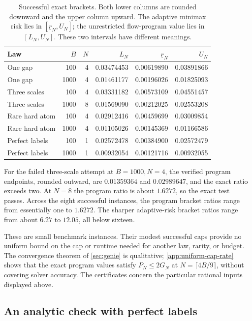 \begin{table}[htbp]
\centering
\small
\setlength{\tabcolsep}{4pt}
\begin{tabular}{lrr rrr}
\toprule
Law & $B$ & $N$ & $L_N$ & $\underline r_N$ & $U_N$\\
\midrule
One gap & 100 & 4 & 0.03474453 & 0.00619890 & 0.03891866\\
One gap & 1000 & 4 & 0.01461177 & 0.00196026 & 0.01825093\\
Three scales & 100 & 4 & 0.03331182 & 0.00573109 & 0.04551457\\
Three scales & 1000 & 8 & 0.01569090 & 0.00212025 & 0.02553208\\
Rare hard atom & 100 & 4 & 0.02912416 & 0.00459699 & 0.03009854\\
Rare hard atom & 1000 & 4 & 0.01105026 & 0.00145369 & 0.01166586\\
Perfect labels & 100 & 1 & 0.02572478 & 0.00384900 & 0.02572479\\
Perfect labels & 1000 & 1 & 0.00932054 & 0.00121716 & 0.00932055\\
\bottomrule
\end{tabular}
\caption{Successful exact brackets. Both lower columns are rounded
downward and the upper column upward. The adaptive minimax risk lies
in $[\underline r_N,U_N]$; the unrestricted flow-program value lies
in $[L_N,U_N]$. These two intervals have different meanings.}
\label{tab:exact-brackets}
\end{table}

For the failed three-scale attempt at $B=1000,N=4$, the verified
program endpoints, rounded outward, are $0.01359364$ and $0.02989647$,
and the exact ratio exceeds two. At $N=8$ the program ratio is about
$1.6272$, so the exact test passes. Across the eight successful
instances, the program bracket ratios range from essentially one to
$1.6272$. The sharper adaptive-risk bracket ratios range from about
$6.27$ to $12.05$, all below sixteen.

These are small benchmark instances. Their modest successful caps
provide no uniform bound on the cap or runtime needed for another law,
rarity, or budget. The convergence theorem of \cref{sec:genie} is qualitative;
\cref{app:uniform-cap-rate} shows that the exact program values satisfy
$P_N\le2G_N$ at $N=\lceil4B/9\rceil$, without covering solver accuracy.
The certificates concern the particular rational inputs displayed above.

\subsection{An analytic check with perfect labels}

